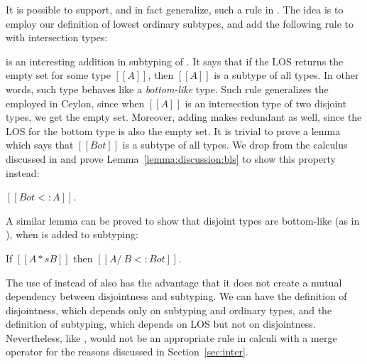 \noindent It is possible to support, and in fact generalize, such a rule in \name. The idea is to
employ our definition of lowest ordinary subtypes, and add the following rule
to \name with intersection types:

\begin{center}
\end{center}

\noindent {} is an interesting addition in subtyping of \name.
It says that if the LOS returns the empty set for some type $[[A]]$, then $[[A]]$
is a subtype of all types. In other words, such type behaves like a \emph{bottom-like} type.
Such rule generalizes the 
employed in Ceylon, since when $[[A]]$ is an intersection type of two
disjoint types, we get the empty set.
Moreover, adding  makes  redundant as well, since the LOS for
the bottom type is also the empty set. It is trivial to prove a lemma which says that $[[Bot]]$ is a subtype of all types. We drop  from the calculus discussed in 
and prove Lemma~\ref{lemma:discussion:bls} to show this property instead:

\begin{lemma}
  $[[Bot <: A]]$.
\label{lemma:discussion:bls}
\end{lemma}

\noindent A similar lemma can be proved to show that disjoint types are bottom-like
(as in ), when  is added to subtyping:

\begin{lemma}
  If $[[A *s B]]$ then $[[A /\ B <: Bot]]$.
\label{lemma:discussion:disjoint-types}
\end{lemma}

\noindent The use of  instead of  also has
the advantage that it does not create a mutual dependency between
disjointness and subtyping. We can have the definition of
disjointness, which depends only on subtyping and ordinary types, and
the definition of subtyping, which depends on LOS but not on
disjointness.
Nevertheless, like ,  would not be an appropriate
rule in calculi with a merge operator for the reasons discussed in Section~\ref{sec:inter}.

